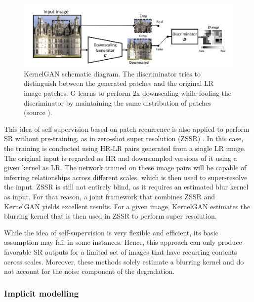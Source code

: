         \begin{figure}[H]
            \centering
            \includegraphics[width=\textwidth]{Includes/2-kernelGAN.png}
            \caption{KernelGAN schematic diagram. The discriminator tries to distinguish between the generated patches and the original LR image patches. G learns to perform 2x downscaling while fooling the discriminator by maintaining the same distribution of patches (source \cite{bellkligler2020blind}).}    
            \label{fig:2-kernelGAN}
        \end{figure}

        This idea of self-supervision based on patch recurrence is also applied to perform SR without pre-training, as in zero-shot super resolution (ZSSR) \cite{shocher2017zeroshot}.
        In this case, the training is conducted using HR-LR pairs generated from a single LR image.
        The original input is regarded as HR and downsampled versions of it using a given kernel as LR. 
        The network trained on these image pairs will be capable of inferring relationships across different scales, which is then used to super-resolve the input.
        ZSSR is still not entirely blind, as it requires an estimated blur kernel as input. 
        For that reason, a joint framework that combines ZSSR and KernelGAN yields excellent results.
        For a given image, KernelGAN estimates the blurring kernel that is then used in ZSSR to perform super resolution. 

        While the idea of self-supervision is very flexible and efficient, its basic assumption may fail in some instances.
        Hence, this approach can only produce favorable SR outputs for a limited set of images that have recurring contents across scales. Moreover, these methods solely estimate a blurring kernel and do not account for the noise component of the degradation.



        \subsubsection{Implicit modelling} \label{subsubsec:implicit-modelling}

